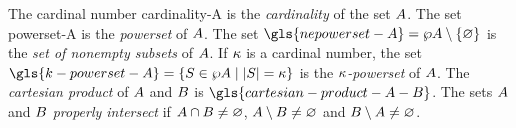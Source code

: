 
The cardinal number \gls{cardinality-A} is the \emph{cardinality} of the set
$A$.
The set \gls{powerset-A} is the \emph{powerset} of $A$.
The set $\gls{nepowerset-A} = \pset\setA \sub \set\eset$ is the \emph{set of
nonempty subsets} of $A$.
If $\kappa$ is a cardinal number,
the set $\gls{k-powerset-A} = \setbd{\setS \in \pset\setA}{\card\setS = \cardk}$
is the \emph{$\kappa$-powerset} of $A$.
The \emph{cartesian product} of $A$ and $B$ is
$\gls{cartesian-product-A-B}$.
The sets $A$ and $B$ \emph{properly intersect} if 
$A \cap B \neq \varnothing$,
$A \setminus B \neq \varnothing$ and
$B \setminus A \neq \varnothing$.